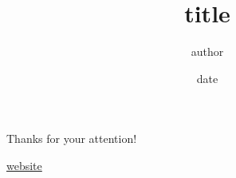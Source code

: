 \documentclass[usenames,dvipsnames]{beamer}
\title{title}
\author{author}
\date{date}
\begin{document}
\begin{frame}[t,plain]
\maketitle
\end{frame}




\begin{frame}
\centering
{
	Thanks for your attention!
}

\large
\vspace{20mm}

\textcolor{darkgray}{\url{website}}
\end{frame}
\end{document}
